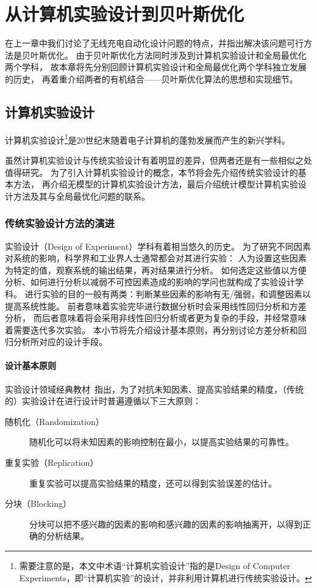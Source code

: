 \documentclass[index]{subfiles}
\begin{document}
\chapter{从计算机实验设计到贝叶斯优化}\label{sec:doebgo}
在上一章中我们讨论了无线充电自动化设计问题的特点，并指出解决该问题可行方法是贝叶斯优化。
由于贝叶斯优化方法同时涉及到计算机实验设计和全局最优化两个学科，
故本章将先分别回顾计算机实验设计和全局最优化两个学科独立发展的历史，
再着重介绍两者的有机结合——贝叶斯优化算法的思想和实现细节。

\section{计算机实验设计}
计算机实验设计\footnote{需要注意的是，本文中术语“计算机实验设计”指的是Design of Computer Experiments，即“计算机实验”的设计，并非利用计算机进行传统实验设计。}是20世纪末随着电子计算机的蓬勃发展而产生的新兴学科\cite{mckay1979}。

虽然计算机实验设计与传统实验设计有着明显的差异，但两者还是有一些相似之处值得研究。
为了引入计算机实验设计的概念，本节将会先介绍传统实验设计的基本方法，
再介绍无模型的计算机实验设计方法，最后介绍统计模型计算机实验设计方法及其与全局最优化问题的联系。

\subsection{传统实验设计方法的演进}
实验设计（Design of Experiment）学科有着相当悠久的历史。
为了研究不同因素对系统的影响，科学界和工业界人士通常都会对其进行实验：
人为设置这些因素为特定的值，观察系统的输出结果，再对结果进行分析。
如何选定这些值以方便分析、如何进行分析以减弱不可控因素造成的影响的学问也就构成了实验设计学科\cite{davies1954}。
进行实验的目的一般有两类：判断某些因素的影响有无/强弱，和调整因素以提高系统性能。
前者意味着实验完毕进行数据分析时会采用线性回归分析和方差分析，
而后者意味着将会采用非线性回归分析或者更为复杂的手段，并经常意味着需要迭代多次实验。
本小节将先介绍设计基本原则，再分别讨论方差分析和回归分析所对应的设计手段。

\subsubsection{设计基本原则}
实验设计领域经典教材~指出，为了对抗未知因素、提高实验结果的精度，（传统的）实验设计在进行设计时普遍遵循以下三大原则：
\begin{description}
  \item[随机化（Randomization）] 随机化可以将未知因素的影响控制在最小，以提高实验结果的可靠性。
  \item[重复实验（Replication）] 重复实验可以提高实验结果的精度，还可以得到实验误差的估计。
  \item[分块（Blocking）] 分块可以把不感兴趣的因素的影响和感兴趣的因素的影响抽离开，以得到正确的分析结果。
\end{description}
\end{document}
